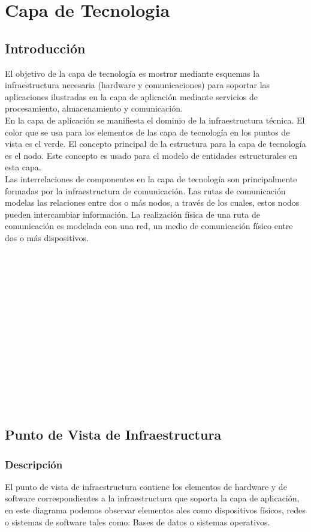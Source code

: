 \chapter{Capa de Tecnologia}

\section{Introducción}
El objetivo de la capa de tecnología es mostrar mediante esquemas la infraestructura necesaria (hardware y comunicaciones) para soportar las aplicaciones ilustradas  en la capa de aplicación mediante servicios de procesamiento, almacenamiento y comunicación.\\
En la capa de aplicación se manifiesta el dominio de la infraestructura técnica. El color que se usa para los elementos de las capa de tecnología en los puntos de vista es el verde. El concepto principal de la estructura para la capa de tecnología es el nodo. Este concepto es usado para el modelo de entidades estructurales en esta capa.\\
Las interrelaciones de componentes en la capa de tecnología son principalmente formadas por la infraestructura de comunicación. Las rutas de comunicación modelas las relaciones entre dos o más nodos, a través de los cuales, estos nodos pueden intercambiar información. La realización física de una ruta de comunicación es modelada con una red, un medio de comunicación físico entre dos o más dispositivos.\\
\\
\\
\\
\\
\\
\\
\\
\\
\\
\\
\\
\\
\\
\\
\section{Punto de Vista de Infraestructura}
\subsection{Descripción}
El punto de vista de infraestructura contiene los elementos de hardware y de software correspondientes a la infraestructura que soporta la capa de aplicación, en este diagrama podemos observar elementos ales como dispositivos físicos, redes o sistemas de software tales como: Bases de datos o sistemas operativos.

